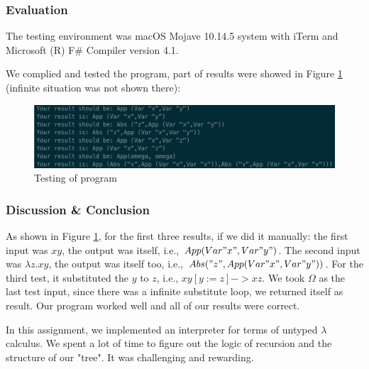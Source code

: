 \documentclass{article}
\begin{document}
\subsubsection*{Evaluation}

The testing environment was macOS Mojave 10.14.5 system with iTerm and Microsoft (R) F\# Compiler version 4.1.

We complied and tested the program, part of results were showed in Figure \ref{fig:eval3} (infinite situation was not shown there):

\begin{figure}[h]
      \centering
      \includegraphics[width=0.8\linewidth]{eval3}
      \caption{Testing of program}
      \label{fig:eval3}
\end{figure}

\subsubsection*{Discussion \& Conclusion}

As shown in Figure \ref{fig:eval3}, for the first three results, if we did it manually: the first input was $xy$, the output was itself, i.e., $App(Var"x",Var"y")$. The second input was $\lambda z.xy$, the output was itself too, i.e., $Abs("z",App(Var"x",Var"y"))$. For the third test, it substituted the $y$ to $z$, i.e., $xy[y:=z]->xz$. We took $\Omega$ as the last test input, since there was a infinite substitute loop, we returned itself as result. Our program worked well and all of our results were correct.

In this assignment, we implemented an interpreter for terms of untyped $\lambda$ calculus. We spent a lot of time to figure out the logic of recursion and the structure of our "tree". It was challenging and rewarding.

\end{document}
